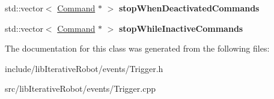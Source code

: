 \begin{DoxyCompactItemize}
\item 
\mbox{\label{classlib_iterative_robot_1_1_trigger_ae715bc91bd9aabafa1b97aace80d33c8}} 
std\+::vector$<$ \mbox{\hyperlink{classlib_iterative_robot_1_1_command}{Command}} $\ast$ $>$ {\bfseries stop\+When\+Deactivated\+Commands}
\item 
\mbox{\label{classlib_iterative_robot_1_1_trigger_ab2ac67a1b851cf8544c253d3ba394c08}} 
std\+::vector$<$ \mbox{\hyperlink{classlib_iterative_robot_1_1_command}{Command}} $\ast$ $>$ {\bfseries stop\+While\+Inactive\+Commands}
\end{DoxyCompactItemize}


The documentation for this class was generated from the following files\+:\begin{DoxyCompactItemize}
\item 
include/lib\+Iterative\+Robot/events/Trigger.\+h\item 
src/lib\+Iterative\+Robot/events/Trigger.\+cpp\end{DoxyCompactItemize}
